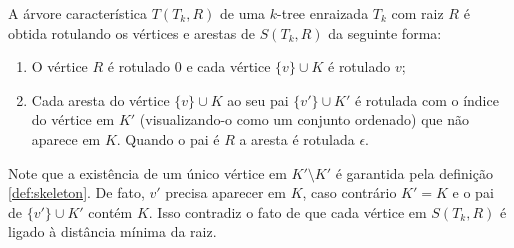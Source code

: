 \begin{definition}
  \cite{caminiti} A árvore característica $T(T_k, R)$ de uma $k$-tree enraizada $T_k$ com raiz $R$ é obtida rotulando os vértices e arestas de $S(T_k, R)$ da seguinte forma:

  \begin{enumerate}
    \item O vértice $R$ é rotulado $0$ e cada vértice $\{v\} \cup K$ é rotulado $v$;
    \item Cada aresta do vértice $\{v\} \cup K$ ao seu pai $\{v'\} \cup K'$ é rotulada com o índice do vértice em $K'$ (visualizando-o como um conjunto ordenado) que não aparece em $K$. Quando o pai é $R$ a aresta é rotulada $\epsilon$.
  \end{enumerate}

  Note que a existência de um único vértice em $K' \setminus K'$ é garantida pela definição \ref{def:skeleton}. De fato, $v'$ precisa aparecer em $K$, caso contrário $K' = K$ e o pai de $\{v'\} \cup K'$ contém $K$. Isso contradiz o fato de que cada vértice em $S(T_k, R)$ é ligado à distância mínima da raiz.
\end{definition}

